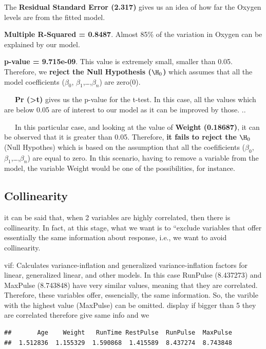 \documentclass[]{article}
\begin{document}
\textbar{} The \textbf{Residual Standard Error (2.317)} gives us an idea
of how far the Oxygen levels are from the fitted model.

\textbar{} \textbf{Multiple R-Squared = 0.8487}. Almost 85\% of the
variation in Oxygen can be explained by our model.

\textbar{} \textbf{p-value = 9.715e-09}. This value is extremely small,
smaller than 0.05. Therefore, we \textbf{reject the Null Hypothesis
(\(\H_0\))} which assumes that all the model coefficients (\(\beta_0\),
\(\beta_1\),\ldots{},\(\beta_n\)) are zero(0).

~~~\textbf{Pr (\textgreater{}\textbar{}t\textbar{})} gives us the
p-value for the t-test. In this case, all the values which are below
0.05 are of interest to our model as it can be improved by those. ..

~~~In this particular case, and looking at the value of \textbf{Weight
(0.18687)}, it can be observed that it is greater than 0.05. Therefore,
\textbf{it fails to reject the \(\H_0\)} (Null Hypothes) which is based
on the assumption that all the coefificients (\(\beta_0\),
\(\beta_1\),\ldots{},\(\beta_n\)) are equal to zero. In this scenario,
having to remove a variable from the model, the variable Weight would be
one of the possibilities, for instance.

\subsection{Collinearity}\label{collinearity}

it can be said that, when 2 variables are highly correlated, then there
is collinearity. In fact, at this stage, what we want is to ``exclude
variables that offer essentially the same information about response,
i.e., we want to avoid collinearity.

vif: Calculates variance-inflation and generalized variance-inflation
factors for linear, generalized linear, and other models. In this case
RunPulse (8.437273) and MaxPulse (8.743848) have very similar values,
meaning that they are correlated. Therefore, these variables offer,
essencially, the same information. So, the varible with the highest
value (MaxPulse) can be omitted. display if bigger than 5 they are
correlated therefore give same info and we

\begin{verbatim}
##       Age    Weight   RunTime RestPulse  RunPulse  MaxPulse 
##  1.512836  1.155329  1.590868  1.415589  8.437274  8.743848
\end{verbatim}
\end{document}
